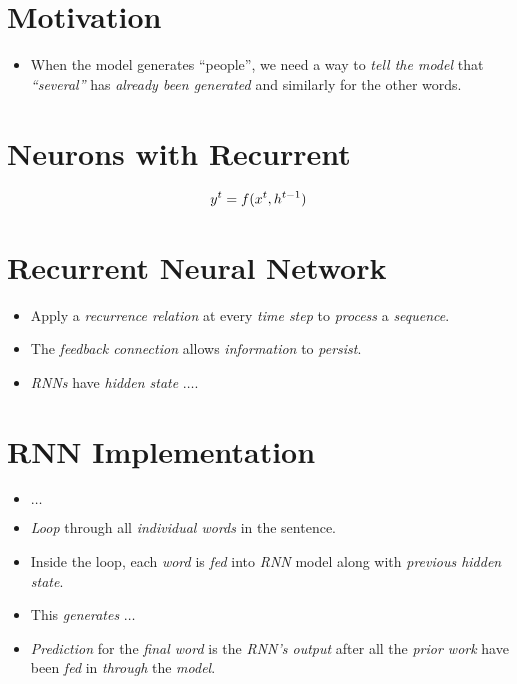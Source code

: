 \documentclass[
	number={10},
	title={Recurrent Neural Networks}
]{cs584notes}
\begin{document}
\section{Motivation}\label{sec:motivation}
\begin{itemize}
	\item When the model generates ``people'', we need a way to \emph{tell the model} that \emph{``several''} has \emph{already been generated} and similarly for the other words.
\end{itemize}

\section{Neurons with Recurrent}\label{sec:neurons-with-recurrent}
\begin{equation}
	y^{t} = f(x^{t}, h^{t-1})\\
	\label{eq:recurrence}
\end{equation}

\section{Recurrent Neural Network}\label{sec:recurrent-neural-network}
\begin{itemize}
	\item Apply a \emph{recurrence relation} at every \emph{time step}  to \emph{process} a \emph{sequence}.
	\item The \emph{feedback connection} allows \emph{information} to \emph{persist}.
	\item \emph{RNNs} have \emph{hidden state}  $\dots$.
\end{itemize}

\section{RNN Implementation}\label{sec:rnn-implementation}
\begin{itemize}
	\item $\dots$
	\item \emph{Loop} through all \emph{individual words} in the sentence.
	\item Inside the loop, each \emph{word} is \emph{fed} into \emph{RNN} model along with \emph{previous hidden state}.
	\item This \emph{generates} $\dots$
	\item \emph{Prediction} for the \emph{final word} is the \emph{RNN's output} after all the \emph{prior work} have been \emph{fed} in \emph{through} the \emph{model}.
\end{itemize}
\end{document}

